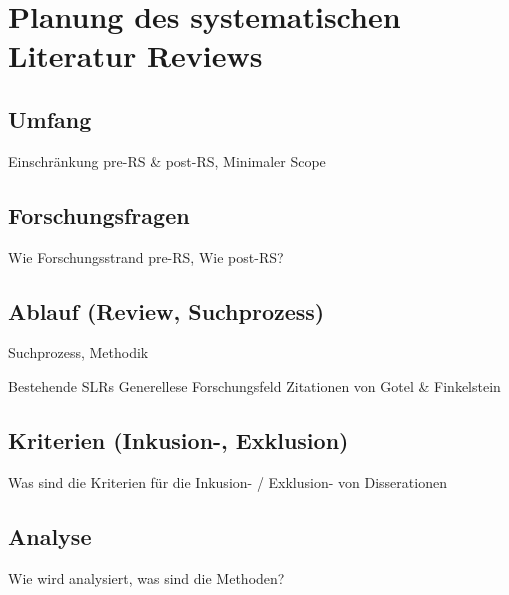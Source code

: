 \section{Planung des systematischen Literatur Reviews}
\subsection{Umfang}

Einschränkung pre-RS & post-RS, Minimaler Scope

\subsection{Forschungsfragen}

Wie Forschungsstrand pre-RS, Wie post-RS?

\subsection{Ablauf (Review, Suchprozess)}

Suchprozess, Methodik

Bestehende SLRs
Generellese Forschungsfeld
Zitationen von Gotel & Finkelstein

\subsection{Kriterien (Inkusion-, Exklusion)}

Was sind die Kriterien für die Inkusion- / Exklusion- von Disserationen

\subsection{Analyse}

Wie wird analysiert, was sind die Methoden?


